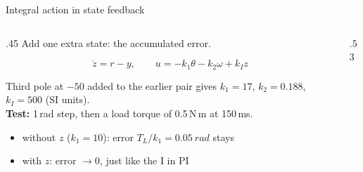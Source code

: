 \documentclass[aspectratio=169,10pt]{beamer}
\begin{document}
\begin{frame}{Integral action in state feedback}
\begin{columns}[T]
\begin{column}{.45\textwidth}
\small
Add one extra state: the accumulated error.
\begin{eqbox}
\[ \dot z=r-y,\qquad u=-k_1\theta-k_2\omega+k_I z \]
\end{eqbox}
Third pole at $-50$ added to the earlier pair gives
$k_1=17$, $k_2=0.188$, $k_I=500$ (SI units).\\[1mm]
\textbf{Test:} 1\,rad step, then a load torque of 0.5\,N\,m at 150\,ms.
\begin{itemize}\setlength\itemsep{.3mm}
\item without $z$ ($k_1=10$): error $T_L/k_1=\SI{0.05}{rad}$ stays
\item with $z$: error $\to0$, just like the I in PI
\end{itemize}
\end{column}
\begin{column}{.53\textwidth}
\centering
{}
\end{column}
\end{columns}
\end{frame}
\end{document}
